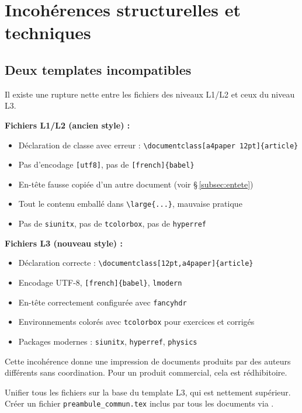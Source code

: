 \documentclass[12pt,a4paper]{article}
\newcommand{\fichier}[1]{\texttt{\small\color{Purple}#1}}
\begin{document}
\section{Incohérences structurelles et techniques}

\subsection{Deux templates incompatibles}

Il existe une rupture nette entre les fichiers des niveaux L1/L2 et ceux du niveau L3.

\begin{info}[title=Templates en présence]
\textbf{Fichiers L1/L2 (ancien style) :}
\begin{itemize}
  \item Déclaration de classe avec erreur : \verb|\documentclass[a4paper 12pt]{article}|
  \item Pas d'encodage \verb|[utf8]|, pas de \verb|[french]{babel}|
  \item En-tête fausse copiée d'un autre document (voir §\,\ref{subsec:entete})
  \item Tout le contenu emballé dans \verb|\large{...}|, mauvaise pratique
  \item Pas de \verb|siunitx|, pas de \verb|tcolorbox|, pas de \verb|hyperref|
\end{itemize}

\textbf{Fichiers L3 (nouveau style) :}
\begin{itemize}
  \item Déclaration correcte : \verb|\documentclass[12pt,a4paper]{article}|
  \item Encodage UTF-8, \verb|[french]{babel}|, \verb|lmodern|
  \item En-tête correctement configurée avec \verb|fancyhdr|
  \item Environnements colorés avec \verb|tcolorbox| pour exercices et corrigés
  \item Packages modernes : \verb|siunitx|, \verb|hyperref|, \verb|physics|
\end{itemize}
\end{info}

Cette incohérence donne une impression de documents produits par des auteurs différents sans coordination. Pour un produit commercial, cela est rédhibitoire.

\begin{recommandation}
Unifier tous les fichiers sur la base du template L3, qui est nettement supérieur. Créer un fichier \fichier{preambule\_commun.tex} inclus par tous les documents via \verb||.
\end{recommandation}
\end{document}
